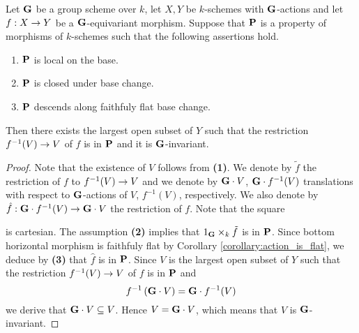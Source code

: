\begin{theorem}\label{theorem:base_locus_of_certain_classes_of_morphisms_are_invariant}
Let $\mathbf{G}$ be a group scheme over $k$, let $X,Y$ be $k$-schemes with $\mathbf{G}$-actions and let $f:X\rightarrow Y$ be a $\mathbf{G}$-equivariant morphism. Suppose that $\mathbf{P}$ is a property of morphisms of $k$-schemes such that the following assertions hold.
\begin{enumerate}[label=\emph{\textbf{(\arabic*)}}, leftmargin=3.0em]
\item $\mathbf{P}$ is local on the base.
\item $\mathbf{P}$ is closed under base change.
\item $\mathbf{P}$ descends along faithfuly flat base change.
\end{enumerate}
Then there exists the largest open subset of $Y$ such that the restriction $f^{-1}(V)\rightarrow V$ of $f$ is in $\mathbf{P}$ and it is $\mathbf{G}$-invariant.
\end{theorem}
\begin{proof}
Note that the existence of $V$ follows from \textbf{(1)}. We denote by $\tilde{f}$ the restriction of $f$ to $f^{-1}(V)\rightarrow V$ and we denote by $\mathbf{G}\cdot V$, $\mathbf{G}\cdot f^{-1}(V)$ translations with respect to $\mathbf{G}$-actions of $V$, $f^{-1}(V)$, respectively. We also denote by $\hat{f}:\mathbf{G}\cdot f^{-1}(V)\rightarrow \mathbf{G}\cdot V$ the restriction of $f$. Note that the square
\begin{center}
\end{center}
is cartesian. The assumption \textbf{(2)} implies that $1_{\mathbf{G}}\times_k\tilde{f}$ is in $\mathbf{P}$. Since bottom horizontal morphism is faithfuly flat by Corollary \ref{corollary:action_is_flat}, we deduce by \textbf{(3)} that $\hat{f}$ is in $\mathbf{P}$. Since $V$ is the largest open subset of $Y$ such that the restriction $f^{-1}(V)\rightarrow V$ of $f$ is in $\mathbf{P}$ and
$$f^{-1}\left(\mathbf{G}\cdot V\right) = \mathbf{G}\cdot f^{-1}(V)$$
we derive that $\mathbf{G}\cdot V \subseteq V$. Hence $V = \mathbf{G}\cdot V$, which means that $V$ is $\mathbf{G}$-invariant.
\end{proof}

